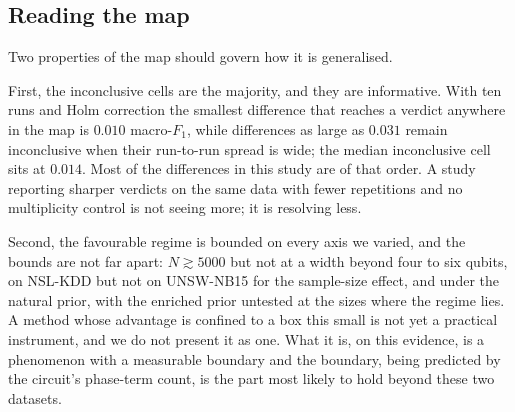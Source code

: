 \subsection{Reading the map}
\begin{revbody}

Two properties of the map should govern how it is generalised.

First, the inconclusive cells are the majority, and they are informative. With
ten runs and Holm correction the smallest difference that reaches a verdict
anywhere in the map is $0.010$ macro-$F_1$, while differences as large as
$0.031$ remain inconclusive when their run-to-run spread is wide; the median
inconclusive cell sits at $0.014$. Most of the differences in this study are of
that order. A study reporting sharper verdicts on the same data with fewer
repetitions and no multiplicity control is not seeing more; it is resolving
less.

Second, the favourable regime is bounded on every axis we varied, and the
bounds are not far apart: $N \gtrsim 5000$ but not at a width beyond four to six
qubits, on NSL-KDD but not on UNSW-NB15 for the sample-size effect, and under
the natural prior, with the enriched prior untested at the sizes where the
regime lies. A method whose advantage is confined to a
box this small is not yet a practical instrument, and we do not present it as
one. What it is, on this evidence, is a phenomenon with a measurable boundary
and the boundary, being predicted by the circuit's phase-term count, is the
part most likely to hold beyond these two datasets.
\end{revbody}
